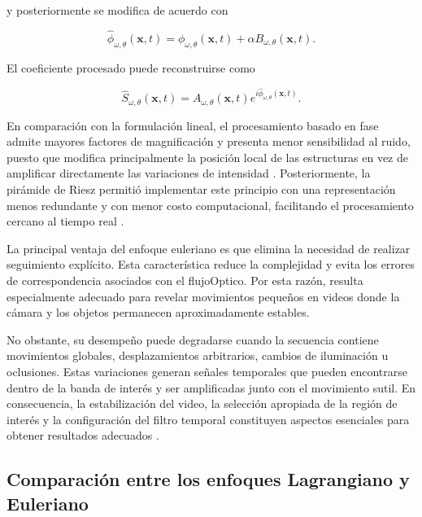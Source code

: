 y posteriormente se modifica de acuerdo con

\begin{equation}
    \widehat{\phi}_{\omega,\theta}(\mathbf{x},t)
    =
    \phi_{\omega,\theta}(\mathbf{x},t)
    +
    \alpha B_{\omega,\theta}(\mathbf{x},t).
    \label{eq:amplificacion_fase}
\end{equation}

El coeficiente procesado puede reconstruirse como

\begin{equation}
    \widehat{S}_{\omega,\theta}(\mathbf{x},t)
    =
    A_{\omega,\theta}(\mathbf{x},t)
    e^{i\widehat{\phi}_{\omega,\theta}(\mathbf{x},t)}.
    \label{eq:coeficiente_complejo_magnificado}
\end{equation}

En comparación con la formulación lineal, el procesamiento basado en fase admite mayores factores de magnificación y presenta menor sensibilidad al ruido, puesto que modifica principalmente la posición local de las estructuras en vez de amplificar directamente las variaciones de intensidad \cite{wadhwa2013phase}. Posteriormente, la pirámide de Riesz permitió implementar este principio con una representación menos redundante y con menor costo computacional, facilitando el procesamiento cercano al tiempo real \cite{wadhwa2014riesz}.

La principal ventaja del enfoque euleriano es que elimina la necesidad de realizar seguimiento explícito. Esta característica reduce la complejidad y evita los errores de correspondencia asociados con el \gls{flujoOptico}. Por esta razón, resulta especialmente adecuado para revelar movimientos pequeños en videos donde la cámara y los objetos permanecen aproximadamente estables.

No obstante, su desempeño puede degradarse cuando la secuencia contiene movimientos globales, desplazamientos arbitrarios, cambios de iluminación u oclusiones. Estas variaciones generan señales temporales que pueden encontrarse dentro de la banda de interés y ser amplificadas junto con el movimiento sutil. En consecuencia, la estabilización del video, la selección apropiada de la región de interés y la configuración del filtro temporal constituyen aspectos esenciales para obtener resultados adecuados \cite{ahmed2023overview}.
	\subsection{Comparación entre los enfoques Lagrangiano y Euleriano}
	\label{subsubsec:comparacion_lagrangiano_euleriano}

